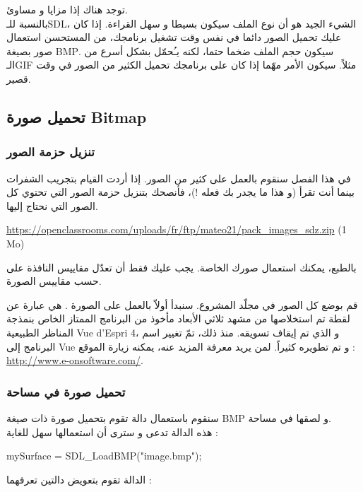 توجد هناك إذا مزايا و مساوئ.\\
بالنسبة للـ\textenglish{SDL}،
الشيء الجيد هو أن نوع الملف سيكون بسيطا و سهل القراءة. إذا كان عليك تحميل الصور دائما في نفس وقت تشغيل برنامجك، من المستحسن استعمال صور بصيغة 
\textenglish{BMP}.
سيكون حجم الملف ضخما حتما، لكنه يـُحمّل بشكل أسرع من الـ\textenglish{GIF}
مثلاً. سيكون الأمر مهّما إذا كان على برنامجك تحميل الكثير من الصور في وقت قصير.

\subsection{تحميل صورة \textenglish{Bitmap}}

\subsubsection{تنزيل حزمة الصور}

في هذا الفصل سنقوم بالعمل على كثير من الصور. إذا أردت القيام بتجريب الشفرات بينما أنت تقرأ (و هذا ما يجدر بك فعله !)، فأنصحك بتنزيل حزمة الصور التي تحتوي كل الصور التي نحتاج إليها.

\textenglish{\url{https://openclassrooms.com/uploads/fr/ftp/mateo21/pack_images_sdz.zip} (1 Mo)}

بالطبع، يمكنك استعمال صورك الخاصة. يجب عليك فقط أن تعدّل مقاييس النافذة على حسب مقاييس الصورة.

قم بوضع كل الصور في مجلّد المشروع. سنبدأ أولاّ بالعمل على الصورة 
.
هي عبارة عن لقطة تم استخلاصها من مشهد ثلاثي الأبعاد مأخوذ من البرنامج الممتاز الخاص بنمذجة المناظر الطبيعية
\textenglish{Vue d'Espri 4}،
و الذي تم إيقاف تسويقه. منذ ذلك، تمّ تغيير اسم البرنامج إلى
\textenglish{Vue}
و تم تطويره كثيراً. لمن يريد معرفة المزيد عنه، يمكنه زيارة الموقع :
\url{http://www.e-onsoftware.com/}.

\subsubsection{تحميل صورة في مساحة}

سنقوم باستعمال دالة تقوم بتحميل صورة ذات صيغة
\textenglish{BMP}
و لصقها في مساحة.\\
هذه الدالة تدعى 
و سترى أن استعمالها سهل للغاية :

\begin{Csource}
mySurface = SDL_LoadBMP("image.bmp");
\end{Csource}

الدالة
تقوم بتعويض دالتين تعرفهما :

